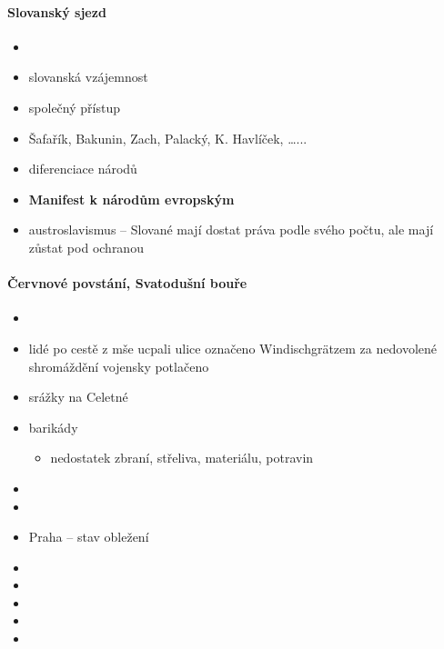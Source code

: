 \paragraph{Slovanský sjezd}
\begin{itemize}
\item {}
\item slovanská vzájemnost
\item společný přístup
\item Šafařík, Bakunin, Zach, Palacký, K. Havlíček, \ldots...
\item diferenciace národů
\item \textbf{Manifest k národům evropským}
\item austroslavismus -- Slované mají dostat práva podle svého počtu, ale mají zůstat pod ochranou 
\end{itemize}

\paragraph{Červnové povstání, Svatodušní bouře}
\begin{itemize}
\item {}
\item lidé po cestě z mše ucpali ulice \ra označeno Windischgrätzem za nedovolené shromáždění \ra vojensky potlačeno
\item srážky na Celetné
\item barikády
	\begin{itemize}
	\item nedostatek zbraní, střeliva, materiálu, potravin
	\end{itemize}
\item {}
\item {}
\item Praha -- stav obležení
\item {}
\item {}
\item {}
\item {}
\item {}
\end{itemize}

